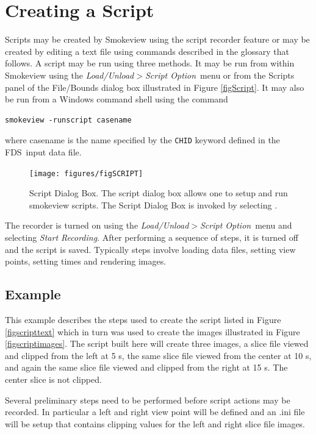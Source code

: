 \documentclass[11pt,twoside]{book}
\newcommand{\figoptions}{hbp}
\newcommand{\fds}{{FDS}}
\newcommand{\frameit}[1]{\fbox{\tt #1}}
\begin{document}
\section{Creating a Script}
Scripts may be created by Smokeview using the script recorder feature
or may be created by editing a text file using commands described in the glossary that follows.
A script may be run using three methods.  It may be run from within Smokeview using
the {\em Load/Unload$>$Script Option}\ menu or
from the Scripts panel of the File/Bounds dialog box illustrated in Figure \ref{figScript}.
It may also be run from a Windows command shell using the command

\begin{verbatim}
smokeview -runscript casename
\end{verbatim}

\noindent where casename is the name specified by
the {\tt CHID} keyword defined in the \fds\ input data file.

\begin{figure}[\figoptions]
\centerline{
\texttt{[image: figures/figSCRIPT]}
}
\caption[Script Dialog Box.]{Script Dialog Box. The script dialog box allows one
to setup and run smokeview scripts.  The
Script Dialog Box is invoked by selecting
\frameit{Dialogs$>$File/Bounds}. }
\label{figSCRIPT}
\end{figure}

The recorder is turned on using the
{\em Load/Unload$>$Script Option}\ menu and selecting {\em Start Recording}.
After performing a sequence of steps, it is turned off and the script is saved. Typically steps involve loading data files,
setting view points, setting times and rendering images.


\subsection{Example}
This example describes the steps used to create the script listed
in Figure \ref{figscripttext} which in turn was used to
create the images
illustrated in Figure \ref{figscriptimages}.  The script built here
will create three images,
a slice file viewed and clipped from the left at 5 s,
the same slice file viewed from the center at 10 s,
and again the same slice file viewed and clipped from the right at 15 s.
The center slice is not clipped.

Several preliminary steps need to be performed before script actions may be recorded.
In particular a left and right view point will be defined and
an .ini file will be setup that contains clipping values for the
left and right slice file images.
\end{document}
